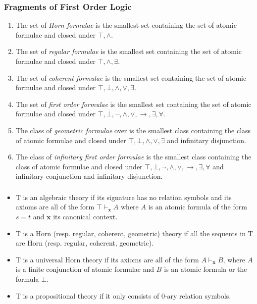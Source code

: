 \documentclass[UTF8,aspectratio=43,11pt,colorlinks,compress,openany]{beamer}%
\begin{document}
\begin{frame}\frametitle{Fragments of First Order Logic}
\begin{enumerate}
	\item The set of \emph{Horn formulae} is the smallest set containing the set of atomic formulae and closed under $\top,\wedge$.
	\item The set of \emph{regular formulae} is the smallest set containing the set of atomic formulae and closed under $\top,\wedge,\exists$.
	\item The set of \emph{coherent formulae} is the smallest set containing the set of atomic formulae and closed under $\top,\bot,\wedge,\vee,\exists$.
	\item The set of \emph{first order formulae} is the smallest set containing the set of atomic formulae and closed under $\top,\bot,\neg,\wedge,\vee,\to,\exists,\forall$.
	\item The class of \emph{geometric formulae} over is the smallest class containing the class of atomic formulae and closed under $\top,\bot,\wedge,\vee,\exists$ and infinitary disjunction.
	\item The class of \emph{infinitary first order formulae} is the smallest class containing the class of atomic formulae and closed under $\top,\bot,\neg,\wedge,\vee,\to,\exists,\forall$ and infinitary conjunction and infinitary disjunction.
\end{enumerate}
\end{frame}

\begin{frame}\frametitle{}
\begin{itemize}
	\item $\mathrm{T}$ is an algebraic theory if its signature has no relation symbols and its axioms are all of the form $\top\vdash_{\mathbf{x}}A$ where $A$ is an atomic formula of the form $s=t$ and $\mathbf{x}$ its canonical context.
	\item $\mathrm{T}$ is a Horn (resp. regular, coherent, geometric) theory if all the sequents in $\mathrm{T}$ are Horn (resp. regular, coherent, geometric).
	\item $\mathrm{T}$ is a universal Horn theory if its axioms are all of the form $A\vdash_{\mathbf{x}}B$, where $A$ is a finite conjunction of atomic formulae and $B$ is an atomic formula or the formula $\bot$.
	\item $\mathrm{T}$ is a propositional theory if it only consists of $0$-ary relation symbols.
\end{itemize}
\end{frame}
\end{document}
